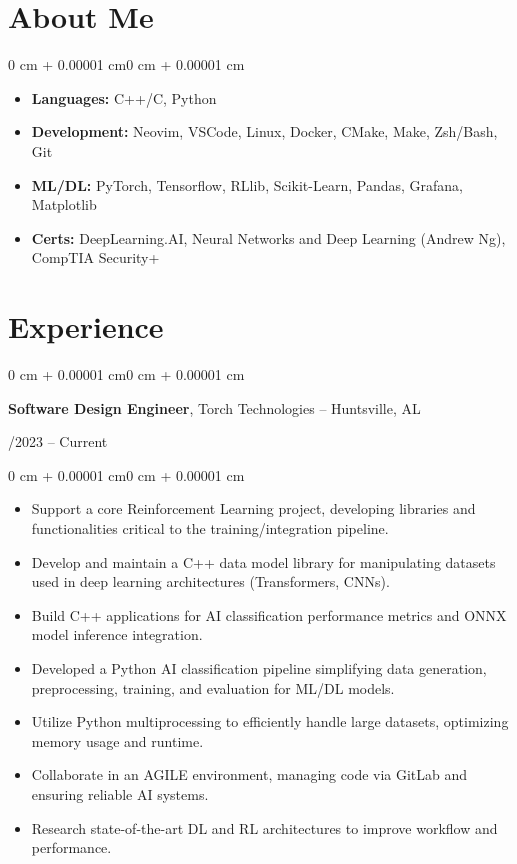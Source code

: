 \documentclass[10pt, letterpaper]{article}
\newenvironment{highlights}{
    \begin{itemize}[
        topsep=0.10 cm,
        parsep=0.10 cm,
        partopsep=0pt,
        itemsep=0pt,
        leftmargin=0 cm + 10pt
    ]
}{
    \end{itemize}
}
\newenvironment{onecolentry}{
    \begin{adjustwidth}{0 cm + 0.00001 cm}{0 cm + 0.00001 cm}
}{
    \end{adjustwidth}
}
\newenvironment{twocolentry}[2][]{
    \onecolentry
    \def\secondColumn{#2}
    \setcolumnwidth{\fill, 4.5 cm}
    \begin{paracol}{2}
}{
    \switchcolumn \raggedleft \secondColumn
    \end{paracol}
    \endonecolentry
}
\begin{document}
\section{About Me}

\begin{onecolentry}
    \begin{highlights}
        \item \textbf{Languages:} C++/C, Python
        \item \textbf{Development:} Neovim, VSCode, Linux, Docker, CMake, Make, Zsh/Bash, Git
        \item \textbf{ML/DL:} PyTorch, Tensorflow, RLlib, Scikit-Learn, Pandas, Grafana, Matplotlib
        \item \textbf{Certs:} DeepLearning.AI, Neural Networks and Deep Learning (Andrew Ng), CompTIA Security+
    \end{highlights}
\end{onecolentry}


\section{Experience}

\begin{twocolentry}{05/2023 – Current}
    \textbf{Software Design Engineer}, Torch Technologies -- Huntsville, AL
\end{twocolentry}

\vspace{0.20 cm}
\begin{onecolentry}
    \begin{highlights}
        \item Support a core Reinforcement Learning project, developing libraries and functionalities critical to the training/integration pipeline.
        \item Develop and maintain a C++ data model library for manipulating datasets used in deep learning architectures (Transformers, CNNs).
        \item Build C++ applications for AI classification performance metrics and ONNX model inference integration.
        \item Developed a Python AI classification pipeline simplifying data generation, preprocessing, training, and evaluation for ML/DL models.
        \item Utilize Python multiprocessing to efficiently handle large datasets, optimizing memory usage and runtime.
        \item Collaborate in an AGILE environment, managing code via GitLab and ensuring reliable AI systems.
        \item Research state-of-the-art DL and RL architectures to improve workflow and performance.
    \end{highlights}
\end{onecolentry}
\end{document}
